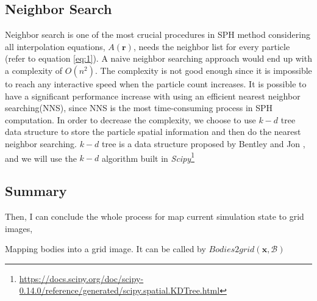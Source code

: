     \subsection{Neighbor Search}
    Neighbor search is one of the most crucial procedures in SPH method considering all interpolation equations, $A(\textbf{r})$, needs the neighbor list for every particle (refer to equation \ref{eq:1}). A naive neighbor searching approach would end up with a complexity of $O(n^2)$. The complexity is not good enough since it is impossible to reach any interactive speed when the particle count increases. It is possible to have a significant performance increase with using an efficient nearest neighbor searching(NNS), since NNS is the most time-consuming process in SPH computation. In order to decrease the complexity, we choose to use $k-d$ tree data structure to store the particle spatial information and then do the nearest neighbor searching. $k-d$ tree is a data structure proposed by Bentley and Jon \cite{bentley1975multidimensional}, and we will use the $k-d$ algorithm built in \textit{Scipy}\footnote{\url{https://docs.scipy.org/doc/scipy-0.14.0/reference/generated/scipy.spatial.KDTree.html}}

    \subsection{Summary}
    Then, I can conclude the whole process for map current simulation state to grid images,
    \begin{algorithm}[!h]
        \caption{Mapping bodies into a grid image. It can be called by $Bodies2grid(\mathbf{x}, \mathcal{B})$}
        \label{bodygrid}
    \end{algorithm}

